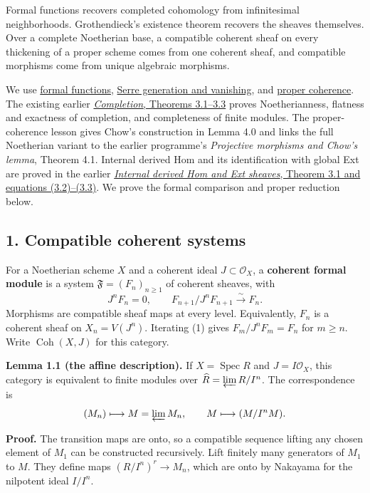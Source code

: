 \documentclass[11pt]{article}
\begin{document}
Formal functions recovers completed cohomology from infinitesimal
neighborhoods. Grothendieck's existence theorem recovers the sheaves
themselves. Over a complete Noetherian base, a compatible coherent sheaf
on every thickening of a proper scheme comes from one coherent sheaf,
and compatible morphisms come from unique algebraic morphisms.

We use \href{the-theorem-on-formal-functions.md}{formal functions},
\href{serres-theorems-on-projective-schemes.md}{Serre generation and
vanishing}, and
\href{proper-morphisms-and-coherent-direct-images.md}{proper coherence}.
The existing earlier \href{../AG-CA/AG-CA-19.html}{\emph{Completion},
Theorems 3.1--3.3} proves Noetherianness, flatness and exactness of
completion, and completeness of finite modules. The proper-coherence
lesson gives Chow's construction in Lemma 4.0 and links the full
Noetherian variant to the earlier programme's \emph{Projective morphisms
and Chow's lemma}, Theorem 4.1. Internal derived Hom and its
identification with global Ext are proved in the earlier
\href{../derived-categories-and-sheaf-operations/internal-derived-hom-and-ext-sheaves.html}{\emph{Internal
derived Hom and Ext sheaves}, Theorem 3.1 and equations (3.2)--(3.3)}.
We prove the formal comparison and proper reduction below.

\subsection{1. Compatible coherent
systems}\label{compatible-coherent-systems}

For a Noetherian scheme \(X\) and a coherent ideal
\(J\subset\mathcal O_X\), a \textbf{coherent formal module} is a system
\(\mathfrak F=(F_n)_{n\geq1}\) of coherent sheaves, with \[
J^nF_n=0,\qquad F_{n+1}/J^nF_{n+1}\xrightarrow{\sim}F_n.
\tag{1}
\] Morphisms are compatible sheaf maps at every level. Equivalently,
\(F_n\) is a coherent sheaf on \(X_n=V(J^n)\). Iterating (1) gives
\(F_m/J^nF_m=F_n\) for \(m\geq n\). Write \(\operatorname{Coh}(X,J)\)
for this category.

\textbf{Lemma 1.1 (the affine description).} If
\(X=\operatorname{Spec}R\) and \(J=I\mathcal O_X\), this category is
equivalent to finite modules over \(\widehat R=\varprojlim R/I^n\). The
correspondence is \[
(M_n)\longmapsto M=\varprojlim M_n,
\qquad M\longmapsto(M/I^nM).
\]

\textbf{Proof.} The transition maps are onto, so a compatible sequence
lifting any chosen element of \(M_1\) can be constructed recursively.
Lift finitely many generators of \(M_1\) to \(M\). They define maps
\((R/I^n)^r\to M_n\), which are onto by Nakayama for the nilpotent ideal
\(I/I^n\).
\end{document}
